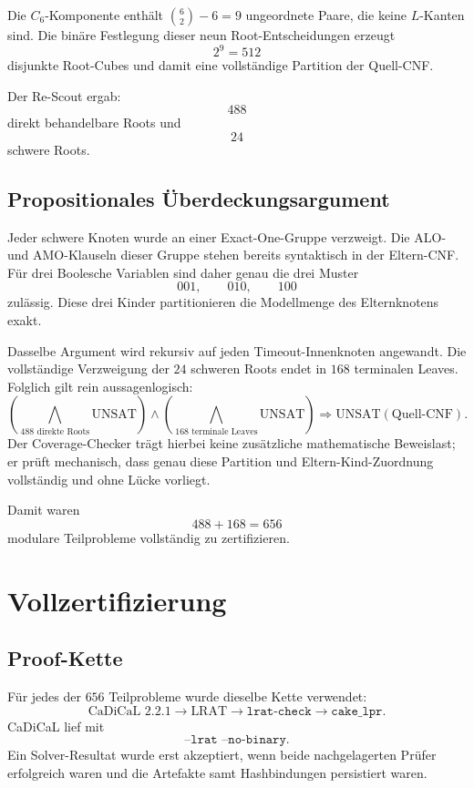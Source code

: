 \documentclass[11pt,a4paper]{article}
\newcommand{\code}[1]{\texttt{#1}}
\begin{document}
Die $C_6$-Komponente enthält $\binom62-6=9$ ungeordnete Paare, die keine $L$-Kanten sind. Die binäre Festlegung dieser neun Root-Entscheidungen erzeugt
\[
2^9=512
\]
disjunkte Root-Cubes und damit eine vollständige Partition der Quell-CNF.

Der Re-Scout ergab:
\[
488
\]
direkt behandelbare Roots und
\[
24
\]
schwere Roots.

\subsection{Propositionales Überdeckungsargument}

Jeder schwere Knoten wurde an einer Exact-One-Gruppe verzweigt. Die ALO- und AMO-Klauseln dieser Gruppe stehen bereits syntaktisch in der Eltern-CNF. Für drei Boolesche Variablen sind daher genau die drei Muster
\[
001,\qquad010,\qquad100
\]
zulässig. Diese drei Kinder partitionieren die Modellmenge des Elternknotens exakt.

Dasselbe Argument wird rekursiv auf jeden Timeout-Innenknoten angewandt. Die vollständige Verzweigung der $24$ schweren Roots endet in $168$ terminalen Leaves. Folglich gilt rein aussagenlogisch:
\[
\left(
\bigwedge_{\text{488 direkte Roots}}\mathrm{UNSAT}
\right)
\wedge
\left(
\bigwedge_{\text{168 terminale Leaves}}\mathrm{UNSAT}
\right)
\Longrightarrow
\mathrm{UNSAT}(\text{Quell-CNF}).
\]
Der Coverage-Checker trägt hierbei keine zusätzliche mathematische Beweislast; er prüft mechanisch, dass genau diese Partition und Eltern-Kind-Zuordnung vollständig und ohne Lücke vorliegt.

Damit waren
\[
488+168=\boxed{656}
\]
modulare Teilprobleme vollständig zu zertifizieren.

\section{Vollzertifizierung}

\subsection{Proof-Kette}

Für jedes der $656$ Teilprobleme wurde dieselbe Kette verwendet:
\[
\text{CaDiCaL 2.2.1}
\longrightarrow
\text{LRAT}
\longrightarrow
\code{lrat-check}
\longrightarrow
\code{cake\_lpr}.
\]
CaDiCaL lief mit
\[
\code{--lrat --no-binary}.
\]
Ein Solver-Resultat wurde erst akzeptiert, wenn beide nachgelagerten Prüfer erfolgreich waren und die Artefakte samt Hashbindungen persistiert waren.
\end{document}
